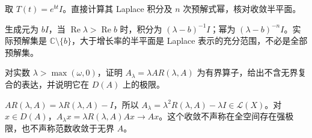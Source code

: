 \begin{exercise}[标量生成元]\label{ex:y9-scalar-laplace}
取 $T(t)=e^{bt}I$。直接计算其 Laplace 积分及 $n$ 次预解式幂，核对收敛半平面。
\end{exercise}
\begin{solution}
生成元为 $bI$，当 $\operatorname{Re}\lambda>\operatorname{Re}b$ 时，积分为 $(\lambda-b)^{-1}I$；幂为 $(\lambda-b)^{-n}I$。实际预解集是 $\mathbb C\setminus\{b\}$，大于增长率的半平面是 Laplace 表示的充分范围，不必是全部预解集。
\end{solution}

\begin{exercise}\label{ex:y9-yosida-form}
对实数 $\lambda>\max(\omega,0)$，证明 $A_\lambda=\lambda AR(\lambda,A)$ 为有界算子，给出不含无界复合的表达，并说明它在 $D(A)$ 上的极限。
\end{exercise}
\begin{solution}
$AR(\lambda,A)=\lambda R(\lambda,A)-I$，所以 $A_\lambda=\lambda^2R(\lambda,A)-\lambda I\in\mathcal L(X)$。对 $x\in D(A)$，$A_\lambda x=\lambda R(\lambda,A)Ax\to Ax$。这个收敛不声称在全空间存在强极限，也不声称范数收敛于无界 $A$。
\end{solution}
